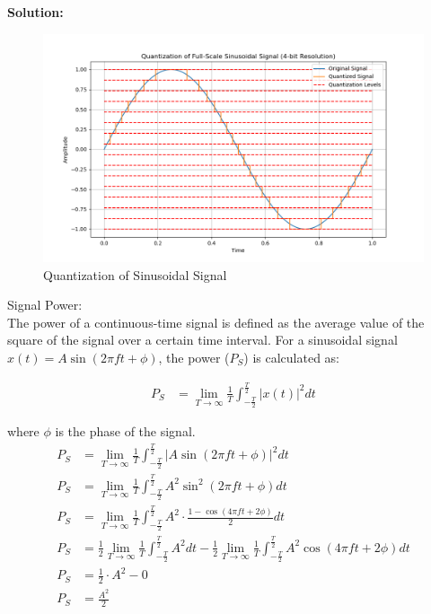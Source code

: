 \documentclass[journal,12pt,onecolumn]{IEEEtran}
\begin{document}
\textbf{Solution:}
\begin{table}[H]

\label{table:Gate.31.2023.0}
\end{table}
\begin{figure}[H]
  \centering
  \includegraphics[width=1\textwidth]{Graph/a.png}
  \caption{Quantization of Sinusoidal Signal}
  \label{fig:Gate.31.2023.1}
\end{figure}
\enumerate
\item Signal Power: \\
The power of a continuous-time signal is defined as the average value of the square of the signal over a certain time interval. For a sinusoidal signal \(x(t) = A \sin(2\pi f t + \phi)\), the power (\(P_S\)) is calculated as:

\begin{align}
P_S &= \lim_{{T \to \infty}} \frac{1}{T} \int_{{-\frac{T}{2}}}^{{\frac{T}{2}}} |x(t)|^2 dt
\end{align}

where \(\phi\) is the phase of the signal.
\begin{align}
P_S &= \lim_{{T \to \infty}} \frac{1}{T} \int_{{-\frac{T}{2}}}^{{\frac{T}{2}}} |A \sin(2\pi f t + \phi)|^2 dt\\
P_S &= \lim_{{T \to \infty}} \frac{1}{T} \int_{{-\frac{T}{2}}}^{{\frac{T}{2}}} A^2 \sin^2(2\pi f t + \phi) dt\\
P_S &= \lim_{{T \to \infty}} \frac{1}{T} \int_{{-\frac{T}{2}}}^{{\frac{T}{2}}} A^2 \cdot \frac{1 - \cos(4\pi f t + 2\phi)}{2} dt\\
P_S &= \frac{1}{2} \lim_{{T \to \infty}} \frac{1}{T} \int_{{-\frac{T}{2}}}^{{\frac{T}{2}}} A^2 dt - \frac{1}{2} \lim_{{T \to \infty}} \frac{1}{T} \int_{{-\frac{T}{2}}}^{{\frac{T}{2}}} A^2 \cos(4\pi f t + 2\phi) dt\\
P_S &= \frac{1}{2} \cdot A^2 - 0\\
P_S &= \frac{A^2}{2}\\
\end{align}
\end{document}
